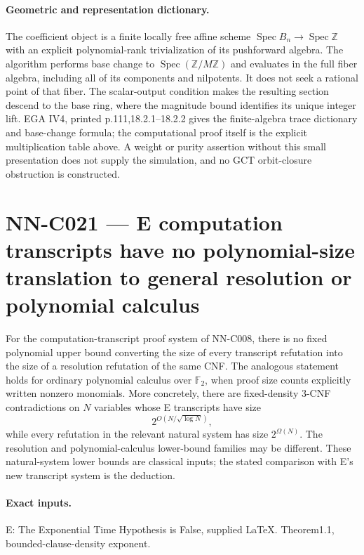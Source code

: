 \paragraph{Geometric and representation dictionary.}
The coefficient object is a finite locally free affine scheme $\operatorname{Spec}B_n\to\operatorname{Spec}\mathbb Z$ with an explicit polynomial-rank trivialization of its pushforward algebra. The algorithm performs base change to $\operatorname{Spec}(\mathbb Z/M\mathbb Z)$ and evaluates in the full fiber algebra, including all of its components and nilpotents. It does not seek a rational point of that fiber. The scalar-output condition makes the resulting section descend to the base ring, where the magnitude bound identifies its unique integer lift. EGA IV4, printed p.111,18.2.1--18.2.2 gives the finite-algebra trace dictionary and base-change formula; the computational proof itself is the explicit multiplication table above. A weight or purity assertion without this small presentation does not supply the simulation, and no GCT orbit-closure obstruction is constructed.



\section{NN-C021 --- E computation transcripts have no polynomial-size translation to general resolution or polynomial calculus}
\begin{proposition}[NN-C021]
For the computation-transcript proof system of NN-C008, there is no fixed polynomial upper bound converting the size of every transcript refutation into the size of a resolution refutation of the same CNF. The analogous statement holds for ordinary polynomial calculus over $\mathbb F_2$, when proof size counts explicitly written nonzero monomials. More concretely, there are fixed-density 3-CNF contradictions on $N$ variables whose E transcripts have size
\[
 2^{O(N/\sqrt{\log N})},
\]
while every refutation in the relevant natural system has size $2^{\Omega(N)}$. The resolution and polynomial-calculus lower-bound families may be different. These natural-system lower bounds are classical inputs; the stated comparison with E's new transcript system is the deduction.
\end{proposition}
\paragraph{Exact inputs.}
E: The Exponential Time Hypothesis is False, supplied LaTeX. Theorem1.1, bounded-clause-density exponent.

